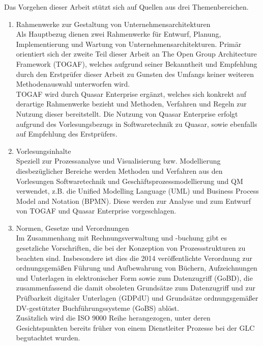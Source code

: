 Das Vorgehen dieser Arbeit stützt sich auf Quellen aus drei Themenbereichen.

\begin{enumerate}



\item{Rahmenwerke zur Gestaltung von Unternehmensarchitekturen}
\\ Als Hauptbezug dienen zwei Rahmenwerke für Entwurf, Planung, Implementierung und Wartung von Unternehmensarchitekturen. 
Primär orientiert sich der zweite Teil dieser Arbeit an The Open Group Architecture Framework (TOGAF), welches aufgrund seiner Bekanntheit und Empfehlung durch den Erstprüfer dieser Arbeit zu Gunsten des Umfangs keiner weiteren Methodenauswahl unterworfen wird. \\
TOGAF wird durch Quasar Enterprise ergänzt, welches sich konkrekt auf derartige Rahmenwerke bezieht und Methoden, Verfahren und Regeln zur Nutzung dieser bereitstellt. 
Die Nutzung von Quasar Enterprise erfolgt aufgrund des Vorlesungsbezugs in Softwaretechnik zu Quasar, sowie ebenfalls auf Empfehlung des Erstprüfers.

\item{Vorlesungsinhalte}
\\ Speziell zur Prozessanalyse und Visualisierung bzw. Modellierung diesbezüglicher Bereiche werden Methoden und Verfahren aus den Vorlesungen Softwaretechnik und Geschäftsprozessmodellierung und QM verwendet, z.B. die Unified Modelling Language (UML) und Business Process Model and Notation (BPMN). 
Diese werden zur Analyse und zum Entwurf von TOGAF und Quasar Enterprise vorgeschlagen.

\item{Normen, Gesetze und Verordnungen}
\\ Im Zusammenhang mit Rechnungsverwaltung und -buchung gibt es gesetzliche Vorschriften, die bei der Konzeption von Prozessstrukturen zu beachten sind.
Insbesondere ist dies die 2014 veröffentlichte Verordnung zur ordnungsgemäßen Führung und Aufbewahrung von Büchern, Aufzeichnungen und Unterlagen in elektronischer Form sowie zum Datenzugriff (GoBD), die zusammenfassend die damit obsoleten Grundsätze zum Datenzugriff und zur Prüfbarkeit digitaler Unterlagen (GDPdU) und Grundsätze ordnungsgemäßer DV-gestützter Buchführungssysteme (GoBS) ablöst.\\
Zusätzlich wird die ISO 9000 Reihe herangezogen, unter deren Gesichtspunkten bereits früher von einem Dienstleiter Prozesse bei der GLC begutachtet wurden.
\end{enumerate}

